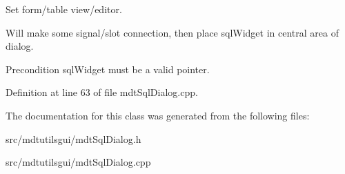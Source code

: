 Set form/table view/editor. 

Will make some signal/slot connection, then place sqlWidget in central area of dialog.

\begin{DoxyPrecond}{Precondition}
sqlWidget must be a valid pointer. 
\end{DoxyPrecond}


Definition at line 63 of file mdtSqlDialog.cpp.



The documentation for this class was generated from the following files:\begin{DoxyCompactItemize}
\item 
src/mdtutilsgui/mdtSqlDialog.h\item 
src/mdtutilsgui/mdtSqlDialog.cpp\end{DoxyCompactItemize}

